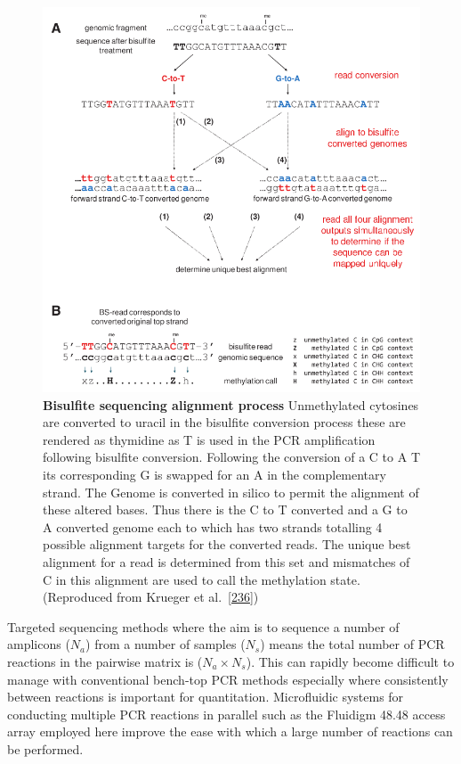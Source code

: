 \documentclass[
]{book}
\begin{document}
\begin{figure}

{\centering \includegraphics[width=0.6\linewidth]{figs/Krueger2011BismarkAlignment} 

}

\caption{\textbf{Bisulfite sequencing alignment process} Unmethylated cytosines are converted to uracil in the bisulfite conversion process these are rendered as thymidine as T is used in the PCR amplification following bisulfite conversion. Following the conversion of a C to A T its corresponding G is swapped for an A in the complementary strand. The Genome is converted in silico to permit the alignment of these altered bases. Thus there is the C to T converted and a G to A converted genome each to which has two strands totalling 4 possible alignment targets for the converted reads. The unique best alignment for a read is determined from this set and mismatches of C in this alignment are used to call the methylation state. (Reproduced from Krueger et al.~{[}\protect\hyperlink{ref-Krueger2011}{236}{]})}\label{fig:Krueger2011BismarkAlignment}
\end{figure}



Targeted sequencing methods where the aim is to sequence a number of amplicons (\(N_a\)) from a number of samples (\(N_s\)) means the total number of PCR reactions in the pairwise matrix is (\(N_a \times N_s\)).
This can rapidly become difficult to manage with conventional bench-top PCR methods especially where consistently between reactions is important for quantitation.
Microfluidic systems for conducting multiple PCR reactions in parallel such as the Fluidigm 48.48 access array employed here improve the ease with which a large number of reactions can be performed.
\end{document}
